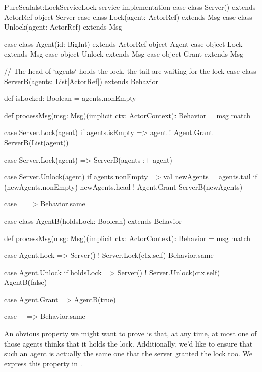 \begin{Code}{PureScala}{lst:LockService}{Lock service implementation}
case class Server() extends ActorRef
object Server {
  case class Lock(agent: ActorRef) extends Msg
  case class Unlock(agent: ActorRef) extends Msg
}

case class Agent(id: BigInt) extends ActorRef
object Agent {
  case object Lock extends Msg
  case object Unlock extends Msg
  case object Grant extends Msg
}

// The head of `agents` holds the lock, the tail are waiting for the lock
case class ServerB(agents: List[ActorRef]) extends Behavior {
  def isLocked: Boolean = agents.nonEmpty

  def processMsg(msg: Msg)(implicit ctx: ActorContext): Behavior = msg match {
    case Server.Lock(agent) if agents.isEmpty =>
      agent ! Agent.Grant
      ServerB(List(agent))

    case Server.Lock(agent) =>
      ServerB(agents :+ agent)

    case Server.Unlock(agent) if agents.nonEmpty =>
      val newAgents = agents.tail
      if (newAgents.nonEmpty) newAgents.head ! Agent.Grant
      ServerB(newAgents)

    case _ =>
      Behavior.same
  }
}

case class AgentB(holdsLock: Boolean) extends Behavior {
  def processMsg(msg: Msg)(implicit ctx: ActorContext): Behavior = msg match {
    case Agent.Lock =>
      Server() ! Server.Lock(ctx.self)
      Behavior.same

    case Agent.Unlock if holdsLock =>
      Server() ! Server.Unlock(ctx.self)
      AgentB(false)

    case Agent.Grant =>
      AgentB(true)

    case _ =>
      Behavior.same
  }
}
\end{Code}

An obvious property we might want to prove is that, at any time, at most one of those agents thinks that it holds the lock. Additionally, we'd like to ensure that such an agent is actually the same one that the server granted the lock too. We express this property in .

